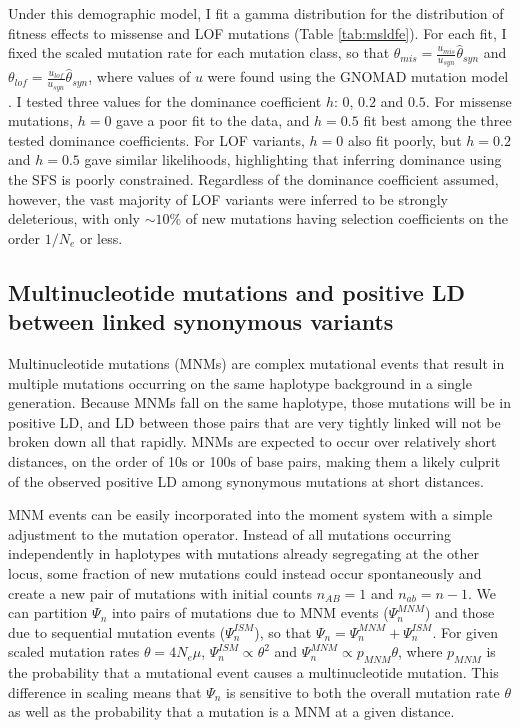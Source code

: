 \documentclass[]{article}
\begin{document}
Under this demographic model, I fit a gamma distribution for the distribution
of fitness effects to missense and LOF mutations (Table \ref{tab:msldfe}). For
each fit, I fixed the scaled mutation rate for each mutation class, so that
\(\theta_{mis} = \frac{u_{mis}}{u_{syn}} \hat\theta_{syn}\) and \(\theta_{lof}
= \frac{u_{lof}}{u_{syn}} \hat\theta_{syn}\), where values of \(u\) were found
using the GNOMAD mutation model \citep{Karczewski2020-le}. I tested three
values for the dominance coefficient \(h\): \(0\), \(0.2\) and \(0.5\). For
missense mutations, \(h=0\) gave a poor fit to the data, and \(h=0.5\) fit best
among the three tested dominance coefficients. For LOF variants, \(h=0\) also
fit poorly, but \(h=0.2\) and \(h=0.5\) gave similar likelihoods, highlighting
that inferring dominance using the SFS is poorly constrained. Regardless of the
dominance coefficient assumed, however, the vast majority of LOF variants were
inferred to be strongly deleterious, with only \(\sim10\%\) of new mutations
having selection coefficients on the order \(1/N_e\) or less.

\subsection{Multinucleotide mutations and positive LD between linked synonymous variants}

Multinucleotide mutations (MNMs) are complex mutational events that result in
multiple mutations occurring on the same haplotype background in a single
generation. Because MNMs fall on the same haplotype, those mutations will be in
positive LD, and LD between those pairs that are very tightly linked will not
be broken down all that rapidly. MNMs are expected to occur over relatively
short distances, on the order of 10s or 100s of base pairs, making them a
likely culprit of the observed positive LD among synonymous mutations at short
distances.

MNM events can be easily incorporated into the moment system with a simple
adjustment to the mutation operator. Instead of all mutations occurring
independently in haplotypes with mutations already segregating at the other
locus, some fraction of new mutations could instead occur spontaneously and
create a new pair of mutations with initial counts \(n_{AB}=1\) and
\(n_{ab}=n-1\). We can partition $\Psi_n$ into pairs of mutations due to MNM
events (\(\Psi_n^{MNM}\)) and those due to sequential mutation events
(\(\Psi_n^{ISM}\)), so that \(\Psi_n=\Psi_n^{MNM}+\Psi_n^{ISM}\). For given
scaled mutation rates \(\theta=4N_e\mu\), \(\Psi_n^{ISM}\propto\theta^2\) and
\(\Psi_n^{MNM}\propto p_{MNM}\theta\), where \(p_{MNM}\) is the probability
that a mutational event causes a multinucleotide mutation. This difference in
scaling means that \(\Psi_n\) is sensitive to both the overall mutation rate
\(\theta\) as well as the probability that a mutation is a MNM at a given
distance.
\end{document}
